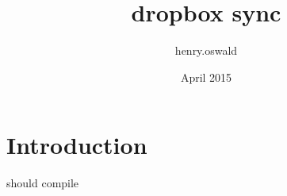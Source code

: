 \documentclass{article}
\title{dropbox sync}
\author{henry.oswald }
\date{April 2015}
\begin{document}
\maketitle

\section{Introduction}
should compile
\end{document}
